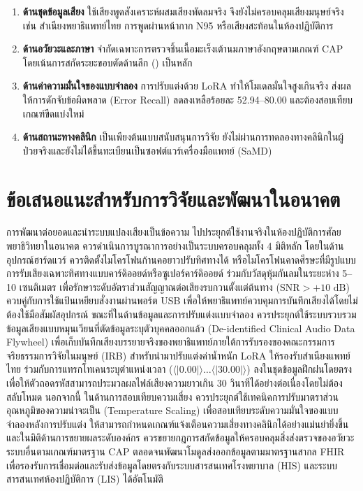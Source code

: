 \begin{enumerate}
    \item[1]\textbf{ด้านชุดข้อมูลเสียง} ใช้เสียงพูดสังเคราะห์ผสมเสียงพัดลมจริง จึงยังไม่ครอบคลุมเสียงมนุษย์จริง เช่น สำเนียงพยาธิแพทย์ไทย การพูดผ่านหน้ากาก N95 หรือเสียงสะท้อนในห้องปฏิบัติการ
    \item[2]\textbf{ด้านอวัยวะและภาษา} จำกัดเฉพาะการตรวจชิ้นเนื้อมะเร็งเต้านมภาษาอังกฤษตามเกณฑ์ CAP โดยเน้นการสกัดระยะขอบตัดด้านลึก () เป็นหลัก
    \item[3]\textbf{ด้านค่าความมั่นใจของแบบจำลอง} การปรับแต่งด้วย LoRA ทำให้โมเดลมั่นใจสูงเกินจริง ส่งผลให้การดักจับข้อผิดพลาด (Error Recall) ลดลงเหลือร้อยละ 52.94--80.00 และต้องสอบเทียบเกณฑ์ขีดแบ่งใหม่
    \item[4]\textbf{ด้านสถานะทางคลินิก} เป็นเพียงต้นแบบสนับสนุนการวิจัย ยังไม่ผ่านการทดลองทางคลินิกในผู้ป่วยจริงและยังไม่ได้ขึ้นทะเบียนเป็นซอฟต์แวร์เครื่องมือแพทย์ (SaMD)
\end{enumerate}

\section{ข้อเสนอแนะสำหรับการวิจัยและพัฒนาในอนาคต}

การพัฒนาต่อยอดและนำระบบแปลงเสียงเป็นข้อความ ไปประยุกต์ใช้งานจริงในห้องปฏิบัติการศัลยพยาธิวิทยาในอนาคต ควรดำเนินการบูรณาการอย่างเป็นระบบครอบคลุมทั้ง 4 มิติหลัก โดยในด้านอุปกรณ์ฮาร์ดแวร์ ควรติดตั้งไมโครโฟนก้านคอยาวปรับทิศทางได้ หรือไมโครโฟนคาดศีรษะที่มีรูปแบบการรับเสียงเฉพาะทิศทางแบบคาร์ดิออยด์หรือซูเปอร์คาร์ดิออยด์ ร่วมกับวัสดุหุ้มกันลมในระยะห่าง 5--10 เซนติเมตร เพื่อรักษาระดับอัตราส่วนสัญญาณต่อเสียงรบกวนตั้งแต่ต้นทาง ($\text{SNR} > +10\text{ dB}$) ควบคู่กับการใช้แป้นเหยียบสั่งงานผ่านพอร์ต USB เพื่อให้พยาธิแพทย์ควบคุมการบันทึกเสียงได้โดยไม่ต้องใช้มือสัมผัสอุปกรณ์ ขณะที่ในด้านข้อมูลและการปรับแต่งแบบจำลอง ควรประยุกต์ใช้ระบบรวบรวมข้อมูลเสียงแบบหมุนเวียนที่ตัดข้อมูลระบุตัวบุคคลออกแล้ว (De-identified Clinical Audio Data Flywheel) เพื่อเก็บบันทึกเสียงบรรยายจริงของพยาธิแพทย์ภายใต้การรับรองของคณะกรรมการจริยธรรมการวิจัยในมนุษย์ (IRB) สำหรับนำมาปรับแต่งค่าน้ำหนัก LoRA ให้รองรับสำเนียงแพทย์ไทย ร่วมกับการแทรกโทเคนระบุตำแหน่งเวลา ($\langle|0.00|\rangle \dots \langle|30.00|\rangle$) ลงในชุดข้อมูลฝึกฝนโดยตรง เพื่อให้ตัวถอดรหัสสามารถประมวลผลไฟล์เสียงความยาวเกิน 30 วินาทีได้อย่างต่อเนื่องโดยไม่ต้องสลับโหมด นอกจากนี้ ในด้านการสอบเทียบความเสี่ยง ควรประยุกต์ใช้เทคนิคการปรับมาตราส่วนอุณหภูมิของความน่าจะเป็น (Temperature Scaling) เพื่อสอบเทียบระดับความมั่นใจของแบบจำลองหลังการปรับแต่ง ให้สามารถกำหนดเกณฑ์แจ้งเตือนความเสี่ยงทางคลินิกได้อย่างแม่นยำยิ่งขึ้น และในมิติด้านการขยายผลระดับองค์กร ควรขยายกฎการสกัดข้อมูลให้ครอบคลุมสิ่งส่งตรวจของอวัยวะระบบอื่นตามเกณฑ์มาตรฐาน CAP ตลอดจนพัฒนาโมดูลส่งออกข้อมูลตามมาตรฐานสากล FHIR เพื่อรองรับการเชื่อมต่อและรับส่งข้อมูลโดยตรงกับระบบสารสนเทศโรงพยาบาล (HIS) และระบบสารสนเทศห้องปฏิบัติการ (LIS) ได้อัตโนมัติ

